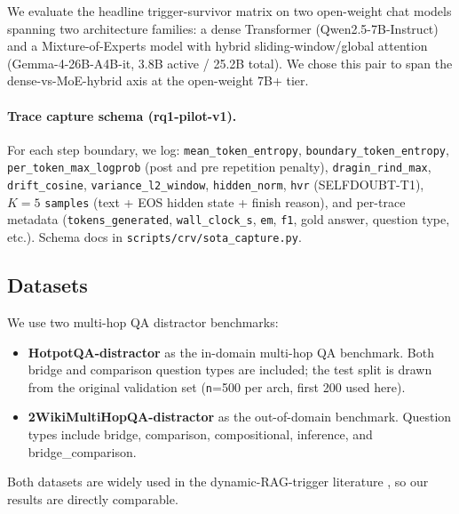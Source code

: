 \documentclass[11pt]{article}
\begin{document}
We evaluate the headline trigger-survivor matrix on two open-weight chat
models spanning two architecture families: a dense Transformer
(Qwen2.5-7B-Instruct) and a Mixture-of-Experts model with hybrid
sliding-window/global attention (Gemma-4-26B-A4B-it, 3.8B active /
25.2B total). We chose this pair to span the dense-vs-MoE-hybrid axis at the
open-weight 7B+ tier.

\paragraph{Trace capture schema (rq1-pilot-v1).} For each step boundary, we
log: \texttt{mean\_token\_entropy}, \texttt{boundary\_token\_entropy},
\texttt{per\_token\_max\_logprob} (post and pre repetition penalty),
\texttt{dragin\_rind\_max}, \texttt{drift\_cosine},
\texttt{variance\_l2\_window}, \texttt{hidden\_norm}, \texttt{hvr} (SELFDOUBT-T1),
$K{=}5$ \texttt{samples} (text + EOS hidden state + finish reason), and
per-trace metadata (\texttt{tokens\_generated}, \texttt{wall\_clock\_s},
\texttt{em}, \texttt{f1}, gold answer, question type, etc.). Schema docs in
\texttt{scripts/crv/sota\_capture.py}.

\subsection{Datasets}
\label{sec:methods-data}

We use two multi-hop QA distractor benchmarks:

\begin{itemize}
\item \textbf{HotpotQA-distractor} \citep{Yang_HotpotQA} as the in-domain
multi-hop QA benchmark. Both bridge and comparison question types are
included; the test split is drawn from the original validation set
(\texttt{n}=500 per arch, first 200 used here).
\item \textbf{2WikiMultiHopQA-distractor} \citep{Ho_2WikiMHQA} as the
out-of-domain benchmark. Question types include bridge, comparison,
compositional, inference, and bridge\_comparison.
\end{itemize}

Both datasets are widely used in the dynamic-RAG-trigger literature
\citep{Su_DRAGIN, Yao_SeaKR, Tang_MBARAG, Zhang_VerbosityVeracityVCBehavior},
so our results are directly comparable.
\end{document}
